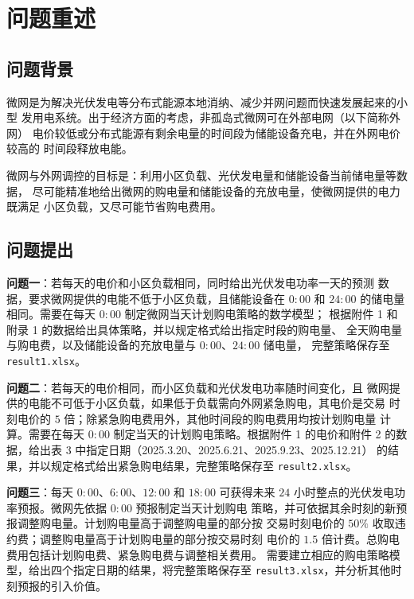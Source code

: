\documentclass[withoutpreface,bwprint]{cumcmthesis}
\begin{document}
\section{问题重述}

\subsection{问题背景}

微网是为解决光伏发电等分布式能源本地消纳、减少并网问题而快速发展起来的小型
发用电系统。出于经济方面的考虑，非孤岛式微网可在外部电网（以下简称外网）
电价较低或分布式能源有剩余电量的时间段为储能设备充电，并在外网电价较高的
时间段释放电能。

微网与外网调控的目标是：利用小区负载、光伏发电量和储能设备当前储电量等数据，
尽可能精准地给出微网的购电量和储能设备的充放电量，使微网提供的电力既满足
小区负载，又尽可能节省购电费用。

\subsection{问题提出}

\textbf{问题一}：若每天的电价和小区负载相同，同时给出光伏发电功率一天的预测
数据，要求微网提供的电能不低于小区负载，且储能设备在 $0{:}00$ 和 $24{:}00$
的储电量相同。需要在每天 $0{:}00$ 制定微网当天计划购电策略的数学模型；
根据附件 1 和附录 1 的数据给出具体策略，并以规定格式给出指定时段的购电量、
全天购电量与购电费，以及储能设备的充放电量与 $0{:}00$、$24{:}00$ 储电量，
完整策略保存至 \texttt{result1.xlsx}。

\textbf{问题二}：若每天的电价相同，而小区负载和光伏发电功率随时间变化，且
微网提供的电能不可低于小区负载，如果低于负载需向外网紧急购电，其电价是交易
时刻电价的 $5$ 倍；除紧急购电费用外，其他时间段的购电费用均按计划购电量
计算。需要在每天 $0{:}00$ 制定当天的计划购电策略。根据附件 1 的电价和附件 2
的数据，给出表 3 中指定日期（2025.3.20、2025.6.21、2025.9.23、2025.12.21）
的结果，并以规定格式给出紧急购电结果，完整策略保存至 \texttt{result2.xlsx}。

\textbf{问题三}：每天 $0{:}00$、$6{:}00$、$12{:}00$ 和 $18{:}00$ 可获得未来
$24$ 小时整点的光伏发电功率预报。微网先依据 $0{:}00$ 预报制定当天计划购电
策略，并可依据其余时刻的新预报调整购电量。计划购电量高于调整购电量的部分按
交易时刻电价的 $50\%$ 收取违约费；调整购电量高于计划购电量的部分按交易时刻
电价的 $1.5$ 倍计费。总购电费用包括计划购电费、紧急购电费与调整相关费用。
需要建立相应的购电策略模型，给出四个指定日期的结果，将完整策略保存至
\texttt{result3.xlsx}，并分析其他时刻预报的引入价值。
\end{document}
